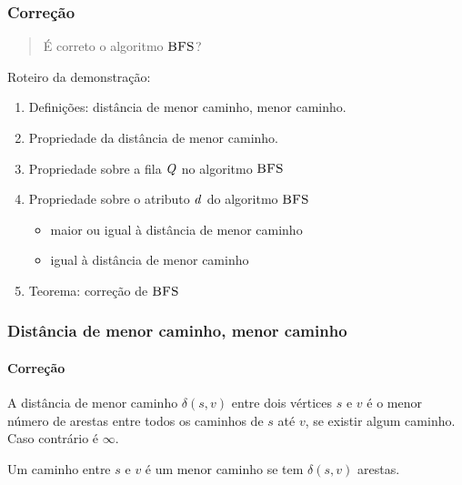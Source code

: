 \documentclass{beamer}
\begin{document}
\begin{frame}
\frametitle{Correção}

\begin{quote}
É correto o algoritmo $\textnormal{\scshape BFS}$?
\end{quote}
\pause
Roteiro da demonstração:
\begin{enumerate}
\item Definições: distância de menor caminho, menor caminho.
\item Propriedade da distância de menor caminho.
\item Propriedade sobre a fila $\id{Q}$ no algoritmo $\textnormal{\scshape BFS}$
\item Propriedade sobre o atributo $\id{d}$ do algoritmo $\textnormal{\scshape BFS}$
\begin{itemize}
\item maior ou igual à distância de menor caminho
\item igual à distância de menor caminho
\end{itemize}
\item Teorema: correção de $\textnormal{\scshape BFS}$
\end{enumerate}

\end{frame}

\begin{frame}
\frametitle{Distância de menor caminho, menor caminho}
\framesubtitle{Correção}

\begin{definition}
A distância de menor caminho $\delta(s, v)$ entre dois vértices $s$ e $v$
é o menor número de arestas entre todos os caminhos de $s$ até $v$, se 
existir algum caminho. Caso contrário é $\infty$.
\end{definition}

\begin{definition}
Um caminho entre $s$ e $v$ é um menor caminho se tem $\delta(s, v)$ arestas.
\end{definition}

\end{frame}
\end{document}
